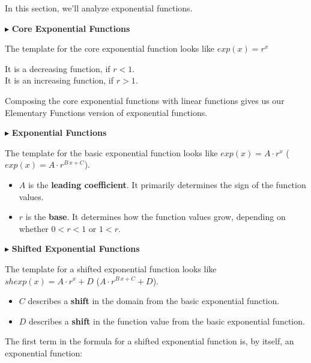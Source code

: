 \documentclass{ximera}
\begin{document}
In this section, we'll analyze exponential functions.




$\blacktriangleright$ \textbf{\textcolor{blue!55!black}{Core Exponential Functions}} 

The template for the core exponential function looks like \textbf{\textcolor{blue!55!black}{$exp(x) = r^x$}}

It is a decreasing function, if $r < 1$.\\
It is an increasing function, if $r > 1$.


Composing the core exponential functions with linear functions gives us our Elementary Functions version of exponential functions.


$\blacktriangleright$ \textbf{\textcolor{blue!55!black}{Exponential Functions}} 


The template for the basic exponential function looks like \textbf{\textcolor{blue!55!black}{$exp(x) = A \cdot r^x$}} (\textbf{\textcolor{blue!55!black}{$exp(x) = A \cdot r^{B \, x + C}$}}). 

\begin{itemize}
\item $A$ is the \textbf{\textcolor{purple!85!blue}{leading coefficient}}.  It primarily determines the sign of the function values.
\item $r$ is the \textbf{\textcolor{purple!85!blue}{base}}. It determines how the function values grow, depending on whether $0 < r < 1$ or $1 < r$.
\end{itemize}





$\blacktriangleright$ \textbf{\textcolor{blue!55!black}{Shifted Exponential Functions}}   

The template for a shifted exponential function looks like \textbf{\textcolor{blue!55!black}{$shexp(x) = A \cdot r^x + D$}}  (\textbf{\textcolor{blue!55!black}{$A \cdot r^{B \, x + C} + D$}}). 

\begin{itemize}
\item $C$ describes a \textbf{\textcolor{purple!85!blue}{shift}} in the domain from the basic exponential function.  
\item $D$ describes a \textbf{\textcolor{purple!85!blue}{shift}} in the function value from the basic exponential function. 
\end{itemize}

The first term in the formula for a shifted exponential function is, by itself, an exponential function:
\end{document}
